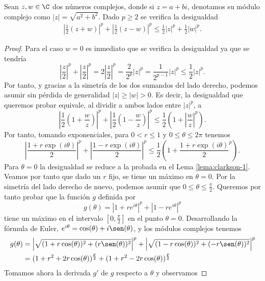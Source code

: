 \begin{lemma}
    Sean $ z, w \in \C $ dos números complejos, donde si $ z = a + bi $, denotamos su módulo complejo como $|z| = \sqrt{a^2 + b^2} $. Dado $ p \geq 2 $ se verifica la desigualdad
    \begin{align}
        \left| \frac{1}{2}(z+w)\right|^p + \left| \frac{1}{2}(z-w)\right|^p \leq \frac{1}{2} |z|^p + \frac{1}{2} |w|^p.
    \end{align}
\end{lemma}
\begin{proof}
    Para el caso $ w = 0 $ es inmediato que se verifica la desigualdad ya que se tendría
    $$
        \left| \frac{z}{2}\right|^p + \left| \frac{z}{2}\right|^p = 2\left|\frac{z}{2}\right|^p = \frac{2}{2^p}\left|z\right|^p = \frac{1}{2^{p-1}}\left|z\right|^p \leq \frac{1}{2}\left|z\right|^p.
    $$
    Por tanto, y gracias a la simetría de los dos sumandos del lado derecho, podemos asumir sin pérdida de generalidad $ |z| \geq |w| > 0 $. Es decir, la desigualdad que queremos probar equivale, al dividir a ambos lados entre $ |z|^p $, a
    $$
        \left| \frac{1}{2}(1+\frac{w}{z})\right|^p + \left| \frac{1}{2}(1-\frac{w}{z})\right|^p \leq \frac{1}{2}\left(1 + \left|\frac{w}{z} \right|^p \right).
    $$
    Por tanto, tomando exponenciales, para $ 0 < r \leq 1 $ y $ 0 \leq \theta \leq 2 \pi $ tenemos
    $$
        \left| \frac{1+r \exp (i \theta)}{2} \right|^p + \left| \frac{1-r \exp (i \theta)}{2} \right|^p \leq \frac{1}{2}\left(1 + \frac{1+r \exp (i \theta)}{2}^p \right).
    $$
    Para $ \theta = 0 $ la desigualdad se reduce a la probada en el Lema \ref{lema:clarkson-1}. Veamos por tanto que dado un $ r $ fijo, se tiene un máximo en $ \theta = 0 $. Por la simetría del lado derecho de nuevo, podemos asumir que $ 0 \leq \theta \leq \frac{\pi}{2} $. Queremos por tanto probar que la función $g$ definida por
    $$
        g(\theta) = |1 + re^{i\theta}|^p + |1 - re^{i\theta}|^p
    $$
    tiene un máximo en el intervalo $[0, \frac{\pi}{2}] $ en el punto $ \theta = 0 $. Desarrollando la fórmula de Euler, $ e^{i\theta} = \cos(\theta) + i\sen(\theta)$,  y los módulos complejos tenemos
    \begin{align}
        g(\theta) &= \left|\sqrt{(1 + r \cos(\theta))^2 + (r\sen(\theta))^2} \right|^p + \left|\sqrt{(1 - r \cos(\theta))^2 + (- r\sen(\theta))^2} \right|^p \\
         &= (1 + r^2 + 2r\cos(\theta))^\frac{p}{2} + (1 + r^2 - 2r\cos(\theta))^\frac{p}{2}
    \end{align}
    Tomamos ahora la derivada $g'$ de $ g $ respecto a $ \theta $ y observamos

\end{proof}
